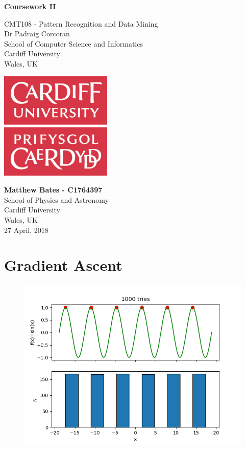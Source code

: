 \documentclass{article}
\author{Matthew Bates}
\begin{document}
\begin{titlepage}
    \begin{center}
        \vspace*{1cm}
        
	\Huge
        \textbf{Coursework II}
        
        \vspace{0.5cm}
	\LARGE
         \vfill

	CMT108 - Pattern Recognition and Data Mining\\
	Dr Padraig Corcoran\\
	School of Computer Science and Informatics\\
	Cardiff University\\
 	Wales, UK
        \vspace{1.5cm}

       	\includegraphics[width=0.4\textwidth]{CardiffLogo.jpg}   
        
        \vspace{0.8cm}
        \Large
        \textbf{Matthew Bates - C1764397}\\
        School of Physics and Astronomy\\
        Cardiff University\\
        Wales, UK\\
        27 April, 2018
        
    \end{center}
\end{titlepage}


\section{Gradient Ascent}

\begin{figure}[h]
\centering
\includegraphics[width=0.9\linewidth]{Q1.png}
\end{figure}
\end{document}
